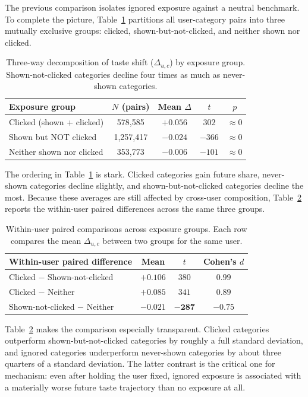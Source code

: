 \documentclass[11pt]{article}
\begin{document}
The previous comparison isolates ignored exposure against a neutral benchmark. To complete the picture, Table~\ref{tab:threeway} partitions all user-category pairs into three mutually exclusive groups: clicked, shown-but-not-clicked, and neither shown nor clicked.

\begin{table}[ht]
\centering
\caption{Three-way decomposition of taste shift ($\Delta_{u,c}$) by exposure group. Shown-not-clicked categories decline four times as much as never-shown categories.}
\label{tab:threeway}
\begin{tabular}{lcccc}
\toprule
Exposure group & $N$ (pairs) & Mean $\Delta$ & $t$ & $p$ \\
\midrule
Clicked (shown + clicked) & 578,585 & $+0.056$ & $302$ & $\approx 0$ \\
Shown but NOT clicked & 1,257,417 & $-0.024$ & $-366$ & $\approx 0$ \\
Neither shown nor clicked & 353,773 & $-0.006$ & $-101$ & $\approx 0$ \\
\bottomrule
\end{tabular}
\end{table}
\FloatBarrier

The ordering in Table~\ref{tab:threeway} is stark. Clicked categories gain future share, never-shown categories decline slightly, and shown-but-not-clicked categories decline the most. Because these averages are still affected by cross-user composition, Table~\ref{tab:paired} reports the within-user paired differences across the same three groups.

\begin{table}[ht]
\centering
\caption{Within-user paired comparisons across exposure groups. Each row compares the mean $\Delta_{u,c}$ between two groups for the same user.}
\label{tab:paired}
\begin{tabular}{lccc}
\toprule
Within-user paired difference & Mean & $t$ & Cohen's $d$ \\
\midrule
Clicked $-$ Shown-not-clicked & $+0.106$ & $380$ & $0.99$ \\
Clicked $-$ Neither & $+0.085$ & $341$ & $0.89$ \\
Shown-not-clicked $-$ Neither & $\mathbf{-0.021}$ & $\mathbf{-287}$ & $\mathbf{-0.75}$ \\
\bottomrule
\end{tabular}
\end{table}
\FloatBarrier

Table~\ref{tab:paired} makes the comparison especially transparent. Clicked categories outperform shown-but-not-clicked categories by roughly a full standard deviation, and ignored categories underperform never-shown categories by about three quarters of a standard deviation. The latter contrast is the critical one for mechanism: even after holding the user fixed, ignored exposure is associated with a materially worse future taste trajectory than no exposure at all.
\end{document}
